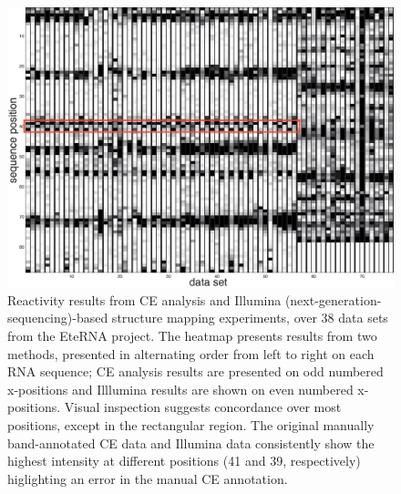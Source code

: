 \documentclass[letter]{bioinfo}
\begin{document}
\begin{figure}
\centering
\includegraphics[width=\linewidth]{figures/FigureS4}
\caption{Reactivity results from CE analysis and Illumina (next-generation-sequencing)-based structure mapping experiments, over 38 data sets from the EteRNA project. The heatmap presents results from two methods, presented in alternating order from left to right on each RNA sequence; CE analysis results are presented on odd numbered x-positions and Illlumina results are shown on even numbered x-positions. Visual inspection suggests concordance over most positions, except in the rectangular region. The original manually band-annotated CE data and Illumina data consistently show the highest intensity at different positions (41 and 39, respectively) higlighting an error in the manual CE annotation.}
\label{f:eterna_comparison}
\end{figure}
\end{document}
